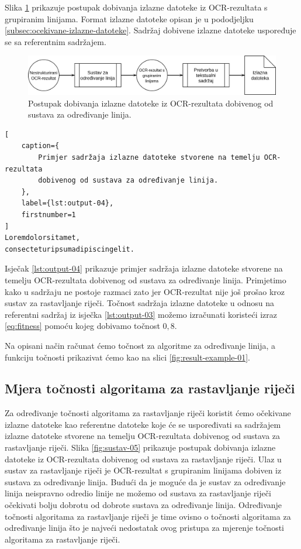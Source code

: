 \documentclass[times, utf8, zavrsni]{fer}
\begin{document}
Slika \ref{fig:sustav-04} prikazuje postupak dobivanja izlazne datoteke iz
OCR-rezultata s grupiranim linijama. Format izlazne datoteke opisan je u
pododjeljku \ref{subsec:ocekivane-izlazne-datoteke}. Sadržaj dobivene izlazne
datoteke uspoređuje se sa referentnim sadržajem.

\begin{figure}[htb]
    \centering
    \captionsetup{justification=centering,margin=2cm}
    \includegraphics[width=\textwidth]{images/sustav-04.png}
    \caption{
        Postupak dobivanja izlazne datoteke iz OCR-rezultata dobivenog od
        sustava za određivanje linija.
    }
    \label{fig:sustav-04}
\end{figure}

\begin{lstlisting}[
    caption={
        Primjer sadržaja izlazne datoteke stvorene na temelju OCR-rezultata
        dobivenog od sustava za određivanje linija.
    },
    label={lst:output-04},
    firstnumber=1
]
Loremdolorsitamet,
consecteturipsumadipiscingelit.
\end{lstlisting}

Isječak \ref{lst:output-04} prikazuje primjer sadržaja izlazne datoteke stvorene
na temelju OCR-rezultata dobivenog od sustava za određivanje linija. Primjetimo
kako u sadržaju ne postoje razmaci zato jer OCR-rezultat nije još prošao kroz
sustav za rastavljanje riječi. Točnost sadržaja izlazne datoteke u odnosu na
referentni sadržaj iz isječka \ref{lst:output-03} možemo izračunati koristeći
izraz \ref{eq:fitness} pomoću kojeg dobivamo točnost $0{,}8$.

Na opisani način računat ćemo točnost za algoritme za određivanje linija, a
funkciju točnosti prikazivat ćemo kao na slici \ref{fig:result-example-01}.


\subsection{Mjera točnosti algoritama za rastavljanje riječi}
Za određivanje točnosti algoritama za rastavljanje riječi koristit ćemo
očekivane izlazne datoteke kao referentne datoteke koje će se uspoređivati sa
sadržajem izlazne datoteke stvorene na temelju OCR-rezultata dobivenog od
sustava za rastavljanje riječi. Slika \ref{fig:sustav-05} prikazuje postupak dobivanja izlazne datoteke iz OCR-rezultata dobivenog od sustava za rastavljanje riječi. Ulaz u sustav za rastavljanje riječi je OCR-rezultat s grupiranim linijama dobiven iz sustava za određivanje linija. Budući da je moguće da je sustav za određivanje linija neispravno odredio linije ne možemo od sustava za rastavljanje riječi očekivati bolju dobrotu od dobrote sustava za određivanje linija. Određivanje točnosti algoritama za rastavljanje riječi je time ovisno o točnosti algoritama za određivanje linija što je najveći nedostatak ovog pristupa za mjerenje točnosti algoritama za rastavljanje riječi.
\end{document}
